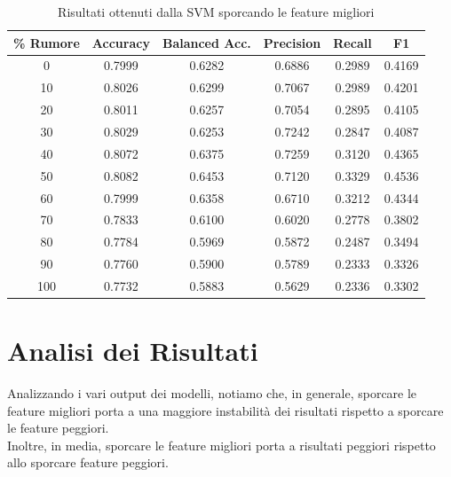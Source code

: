 \documentclass{article}
\begin{document}
\begin{table}[htbp]
\centering
\label{tab:rumore_risultati7}
\begin{tabular}{cccccc}
\hline
\textbf{\% Rumore} & \textbf{Accuracy} & \textbf{Balanced Acc.} & \textbf{Precision} & \textbf{Recall} & \textbf{F1} \\
\hline
0   & 0.7999 & 0.6282 & 0.6886 & 0.2989 & 0.4169 \\
10  & 0.8026 & 0.6299 & 0.7067 & 0.2989 & 0.4201 \\
20  & 0.8011 & 0.6257 & 0.7054 & 0.2895 & 0.4105 \\
30  & 0.8029 & 0.6253 & 0.7242 & 0.2847 & 0.4087 \\
40  & 0.8072 & 0.6375 & 0.7259 & 0.3120 & 0.4365 \\
50  & 0.8082 & 0.6453 & 0.7120 & 0.3329 & 0.4536 \\
60  & 0.7999 & 0.6358 & 0.6710 & 0.3212 & 0.4344 \\
70  & 0.7833 & 0.6100 & 0.6020 & 0.2778 & 0.3802 \\
80  & 0.7784 & 0.5969 & 0.5872 & 0.2487 & 0.3494 \\
90  & 0.7760 & 0.5900 & 0.5789 & 0.2333 & 0.3326 \\
100 & 0.7732 & 0.5883 & 0.5629 & 0.2336 & 0.3302 \\
\hline
\end{tabular}
\caption{Risultati ottenuti dalla SVM sporcando le feature migliori}
\end{table}

\newpage

\section{Analisi dei Risultati}

Analizzando i vari output dei modelli, notiamo che, in generale, sporcare le feature migliori porta a una maggiore instabilità dei risultati rispetto a sporcare le feature peggiori.\\
Inoltre, in media, sporcare le feature migliori porta a risultati peggiori rispetto allo sporcare feature peggiori.
\end{document}
